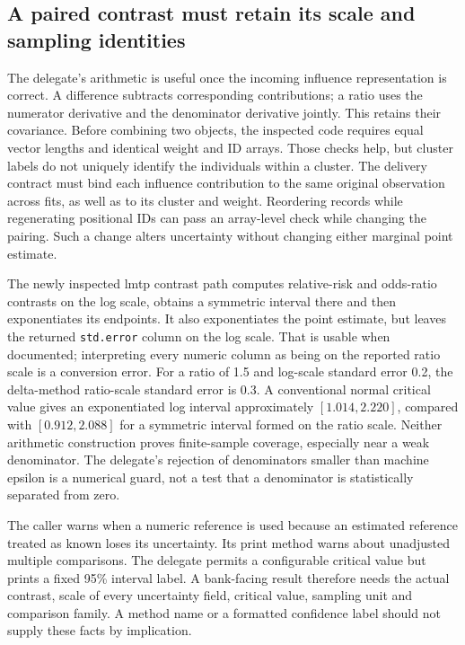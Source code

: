 \subsection{A paired contrast must retain its scale and sampling identities}
\label{rel23:ife-contrasts}

The delegate's arithmetic is useful once the incoming influence representation
is correct. A difference subtracts corresponding contributions; a ratio uses
the numerator derivative and the denominator derivative jointly. This retains
their covariance. Before combining two objects, the inspected code requires
equal vector lengths and identical weight and ID arrays. Those checks help,
but cluster labels do not uniquely identify the individuals within a cluster.
The delivery contract must bind each influence contribution to the same
original observation across fits, as well as to its cluster and weight.
Reordering records while regenerating positional IDs can pass an array-level
check while changing the pairing. Such a change alters uncertainty without
changing either marginal point estimate. \citep{rel23ife}

The newly inspected lmtp contrast path computes relative-risk and odds-ratio
contrasts on the log scale, obtains a symmetric interval there and then
exponentiates its endpoints. It also exponentiates the point estimate, but
leaves the returned \texttt{std.error} column on the log scale. That is usable
when documented; interpreting every numeric column as being on the reported
ratio scale is a conversion error. For a ratio of 1.5 and log-scale standard
error 0.2, the delta-method ratio-scale standard error is 0.3. A conventional
normal critical value gives an exponentiated log interval approximately
$[1.014,2.220]$, compared with $[0.912,2.088]$ for a symmetric interval formed
on the ratio scale. Neither arithmetic construction proves finite-sample
coverage, especially near a weak denominator. The delegate's rejection of
denominators smaller than machine epsilon is a numerical guard, not a test
that a denominator is statistically separated from zero.
\citep{rel23ifecaller,rel23ife,rel23ifewitness}

The caller warns when a numeric reference is used because an estimated
reference treated as known loses its uncertainty. Its print method warns
about unadjusted multiple comparisons. The delegate permits a configurable
critical value but prints a fixed 95\% interval label. A bank-facing result
therefore needs the actual contrast, scale of every uncertainty field,
critical value, sampling unit and comparison family. A method name or a
formatted confidence label should not supply these facts by implication.
\citep{rel23ifecaller,rel23ife}

